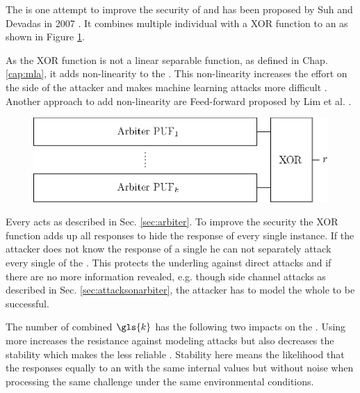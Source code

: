 The \xpuf is one attempt to improve the security of \apufs and has been proposed by Suh and Devadas in 2007 \cite{Suh2007PhysicalGeneration}.
It combines multiple individual \apufs with a \acf{XOR} function to an \xpuf as shown in Figure \ref{fig:xorarbiter}.

As the \ac{XOR} function is not a linear separable function, as defined in Chap. \ref{cap:mla}, it adds non-linearity to the \puf. 
This non-linearity increases the effort on the side of the attacker and makes machine learning attacks more difficult \cite{Greibach2010OnBifurcation, Lim2005ExtractingCircuits}.
Another approach to add non-linearity are Feed-forward \apufs proposed by Lim et al. \cite{Lim2005ExtractingCircuits}.

\begin{figure}[ht]
\centering
\includegraphics[width=1.00\textwidth]{images/xor_arbiter.eps}
\caption[\acs{XOR} \apuf]{\xpuf}
\label{fig:xorarbiter}
\end{figure}

Every \apuf acts as described in Sec. \ref{sec:arbiter}. 
To improve the security the \ac{XOR} function adds up all responses to hide the response of every single \apuf instance.
If the attacker does not know the response of a single \apuf he can not separately attack every single \apuf of the \xpuf \cite{Becker2015ThePUFs}. %
This protects the underling \apufs against direct attacks and if there are no more information revealed, e.g. though side channel attacks as described in Sec. \ref{sec:attacksonarbiter}, the attacker has to model the whole \xpuf to be successful.

The number of combined \apufs $\gls{k}$ has the following two impacts on the \puf.
Using more \apufs increases the resistance against modeling attacks but also decreases the stability which makes the \puf less reliable \cite{Becker2015ThePUFs, Ganji2015WhyPUFs}. %
Stability here means the likelihood that the \apuf responses equally to an \apuf with the same internal values but without noise when processing the same challenge under the same environmental conditions. %

